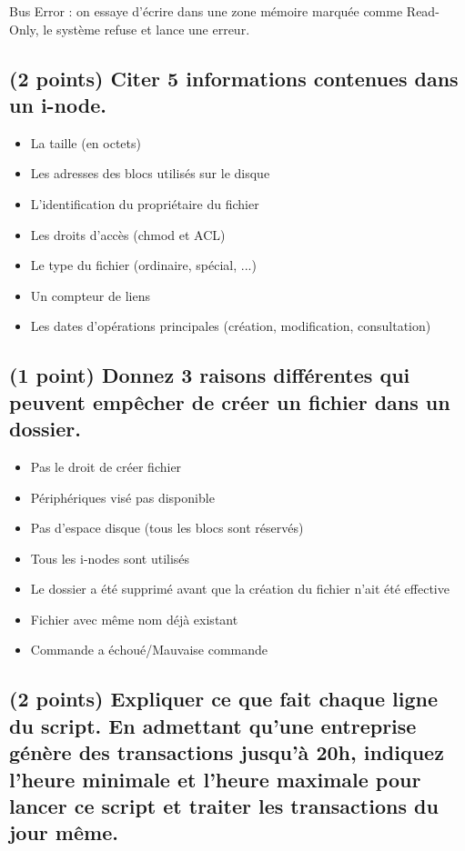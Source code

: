 \documentclass[11pt,a4paper]{article}
\begin{document}
Bus Error : on essaye d'écrire dans une zone mémoire marquée comme Read-Only, le système refuse et lance une erreur.

\bigskip

\subsection{(2 points) Citer 5 informations contenues dans un i-node.}

\bigskip
\begin{itemize}
\item La taille (en octets)
\item Les adresses des blocs utilisés sur le disque
\item L'identification du propriétaire du fichier
\item Les droits d’accès (chmod et ACL)
\item Le type du fichier (ordinaire, spécial, ...)
\item Un compteur de liens
\item Les dates d'opérations principales (création, modification, consultation)
\end{itemize}
\bigskip

\subsection{(1 point) Donnez 3 raisons différentes qui peuvent empêcher de créer un fichier dans un dossier.}

\bigskip
\begin{itemize}
\item Pas le droit de créer fichier
\item Périphériques visé pas disponible
\item Pas d'espace disque (tous les blocs sont réservés)
\item Tous les i-nodes sont utilisés
\item Le dossier a été supprimé avant que la création du fichier n'ait été effective
\item Fichier avec même nom déjà existant
\item Commande a échoué/Mauvaise commande
\end{itemize}

\subsection{(2 points) Expliquer ce que fait chaque ligne du script. En admettant qu'une entreprise génère des transactions jusqu'à 20h, indiquez l'heure minimale et l'heure maximale pour lancer ce script et traiter les transactions du jour même.}
\end{document}
